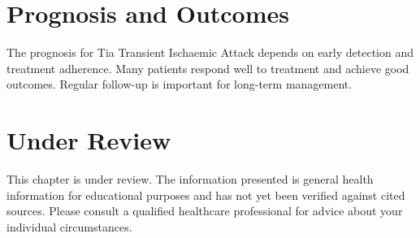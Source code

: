 \section*{Prognosis and Outcomes}
The prognosis for Tia Transient Ischaemic Attack depends on early detection and treatment adherence. Many patients respond well to treatment and achieve good outcomes. Regular follow-up is important for long-term management.
\section*{Under Review}
This chapter is under review. The information presented is general health information for educational purposes and has not yet been verified against cited sources. Please consult a qualified healthcare professional for advice about your individual circumstances.


\clearpage
